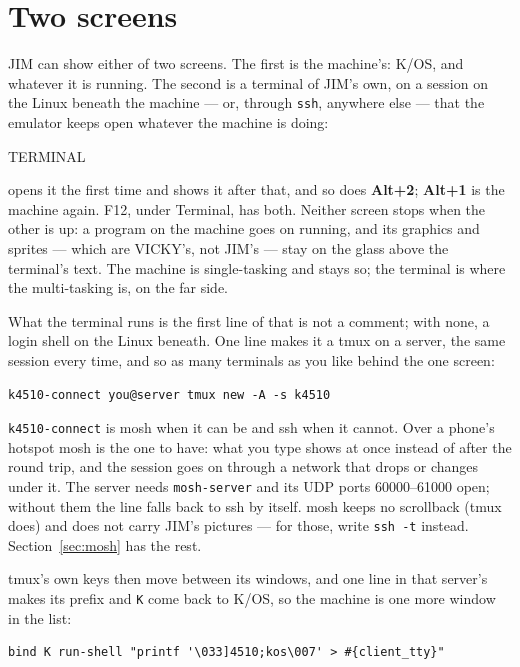 \section{Two screens}\label{sec:screens}
JIM can show either of two screens. The first is the machine's: K/OS,
and whatever it is running. The second is a terminal of JIM's own, on a
session on the Linux beneath the machine --- or, through \texttt{ssh},
anywhere else --- that the emulator keeps open whatever the machine is
doing:

\begin{type}
TERMINAL
\end{type}

\noindent opens it the first time and shows it after that, and so does
\textbf{Alt+2}; \textbf{Alt+1} is the machine again. F12, under
Terminal, has both. Neither screen stops when the other is up: a program
on the machine goes on running, and its graphics and sprites --- which
are VICKY's, not JIM's --- stay on the glass above the terminal's text.
The machine is single-tasking and stays so; the terminal is where the
multi-tasking is, on the far side.

What the terminal runs is the first line of
 that is not a comment; with none, a login
shell on the Linux beneath. One line makes it a tmux on a server, the same
session every time, and so as many terminals as you like behind the one
screen:

\begin{verbatim}
k4510-connect you@server tmux new -A -s k4510
\end{verbatim}

\noindent \texttt{k4510-connect} is mosh when it can be and ssh when it
cannot. Over a phone's hotspot mosh is the one to have: what you type
shows at once instead of after the round trip, and the session goes on
through a network that drops or changes under it. The server needs
\texttt{mosh-server} and its UDP ports 60000--61000 open; without them
the line falls back to ssh by itself. mosh keeps no scrollback (tmux
does) and does not carry JIM's pictures --- for those, write
\texttt{ssh -t} instead. Section~\ref{sec:mosh} has the rest.

\noindent tmux's own keys then move between its windows, and one line in
that server's  makes its prefix and \texttt{K} come
back to K/OS, so the machine is one more window in the list:

\begin{verbatim}
bind K run-shell "printf '\033]4510;kos\007' > #{client_tty}"
\end{verbatim}

